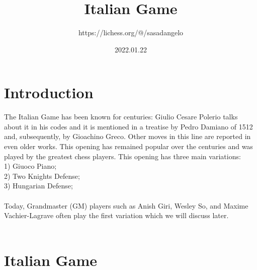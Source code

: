 \documentclass{article}
\title{Italian Game}
\author{https://lichess.org/@/sasadangelo}
\date{2022.01.22}
\begin{document}
\begin{titlepage}
\maketitle
\end{titlepage}
\section{ Introduction}

The Italian Game has been known for centuries: Giulio Cesare Polerio talks about it in his codes and it is mentioned in a treatise by Pedro Damiano of 1512 and, subsequently, by Gioachino Greco. Other moves in this line are reported in even older works. This opening has remained popular over the centuries and was played by the greatest chess players. This opening has three main variations:\\1) Giuoco Piano;\\2) Two Knights Defense;\\3) Hungarian Defense;\\\\Today, Grandmaster (GM) players such as Anish Giri, Wesley So, and Maxime Vachier-Lagrave often play the first variation which we will discuss later.\\
\\
\section{ Italian Game}
\end{document}
